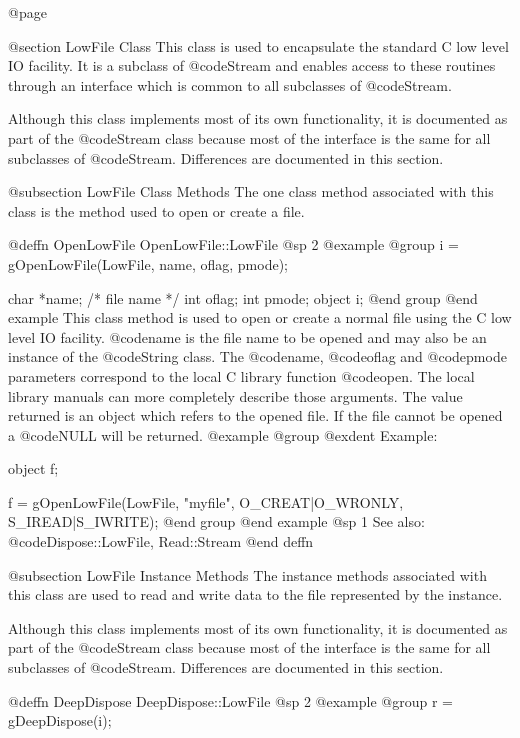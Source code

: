 @page

@section LowFile Class
This class is used to encapsulate the standard C low level IO facility.  It
is a subclass of @code{Stream} and enables access to these routines
through an interface which is common to all subclasses of @code{Stream}.

Although this class implements most of its own functionality, it is
documented as part of the @code{Stream} class because most of the
interface is the same for all subclasses of @code{Stream}.  Differences
are documented in this section.


@subsection LowFile Class Methods
The one class method associated with this class is the method used to
open or create a file.




@deffn {OpenLowFile} OpenLowFile::LowFile
@sp 2
@example
@group
i = gOpenLowFile(LowFile, name, oflag, pmode);

char    *name;  /*  file name  */
int     oflag;
int     pmode;
object  i;
@end group
@end example
This class method is used to open or create a normal file using the C
low level IO facility.  @code{name} is the file name to be opened and
may also be an instance of the @code{String} class.  The @code{name},
@code{oflag} and @code{pmode} parameters correspond to the local C
library function @code{open}.  The local library manuals can more
completely describe those arguments.  The value returned is an object
which refers to the opened file.  If the file cannot be opened a
@code{NULL} will be returned.
@example
@group
@exdent Example:

object  f;

f = gOpenLowFile(LowFile, "myfile", O_CREAT|O_WRONLY,
                 S_IREAD|S_IWRITE);
@end group
@end example
@sp 1
See also:  @code{Dispose::LowFile, Read::Stream}
@end deffn





@subsection LowFile Instance Methods
The instance methods associated with this class are used to read and write
data to the file represented by the instance.

Although this class implements most of its own functionality, it is
documented as part of the @code{Stream} class because most of the
interface is the same for all subclasses of @code{Stream}.  Differences
are documented in this section.





@deffn {DeepDispose} DeepDispose::LowFile
@sp 2
@example
@group
r = gDeepDispose(i);

